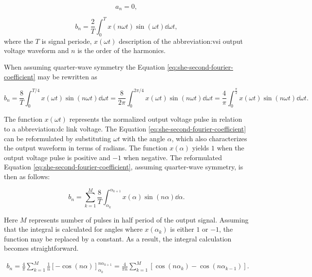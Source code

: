 \documentclass[a4paper, twoside, 11pt]{article}
\begin{document}
            \begin{equation}
                a_n = 0,
                \label{eq:she-first-fourier-coefficient-zero}
            \end{equation}

            \begin{equation}
                b_n = \frac{2}{T} \int_{0}^{T} x(n\omega t)\sin(\omega t) \dd \omega t,
                \label{eq:she-second-fourier-coefficient}
            \end{equation}
            where the $T$ is signal periode, $x(\omega t)$ description of the \gls{abbreviation:vsi} output voltage waveform and $n$ is the order of the harmonics.

            When assuming quarter-wave symmetry the Equation \ref{eq:she-second-fourier-coefficient} may be rewritten as

            \begin{equation}
                b_n = \frac{8}{T} \int_{0}^{T/4} x(\omega t) \sin (n\omega t) \dd \omega t = \frac{8}{2 \pi} \int_{0}^{2 \pi/4} x(\omega t) \sin (n\omega t) \dd \omega t = \frac{4}{\pi} \int_{0}^{\frac{\pi}{2}} x(\omega t) \sin (n\omega t) \dd \omega t.
            \end{equation}

            The function $x(\omega t)$ represents the normalized output voltage pulse in relation to a \gls{abbreviation:dc} link voltage. The Equation \ref{eq:she-second-fourier-coefficient} can be reformulated by substituting $\omega t$ with the angle $\alpha$, which also characterizes the output waveform in terms of radians. The function $x(\alpha)$ yields $1$ when the output voltage pulse is positive and $-1$ when negative. The reformulated Equation \ref{eq:she-second-fourier-coefficient}, assuming quarter-wave symmetry, is then as follows:

            \begin{equation}
                b_n = \sum_{k=1}^{M} \frac{8}{T} \int_{\alpha_k}^{\alpha_{k+1}} x(\alpha) \sin(n\alpha) \dd \alpha.
            \end{equation}

           Here $M$ represents number of pulses in half period of the output signal. Assuming that the integral is calculated for angles where $x(\alpha_k)$ is either $1$ or $-1$, the function may be replaced by a constant. As a result, the integral calculation becomes straightforward.

           \begin{equation}
               \begin{gathered}
                    b_n = \frac{4}{\pi} \sum_{k=1}^{M} \frac{1}{n} \left[ - \cos(n\alpha) \right]_{\alpha_k}^{n\alpha_{k+1}}
                    = \frac{4}{\pi n} \sum_{k=1}^{M} \left[ \cos(n\alpha_k) - \cos(n\alpha_{k-1}) \right].
               \end{gathered}
               \label{eq:she-equation-integration}
           \end{equation}
\end{document}
